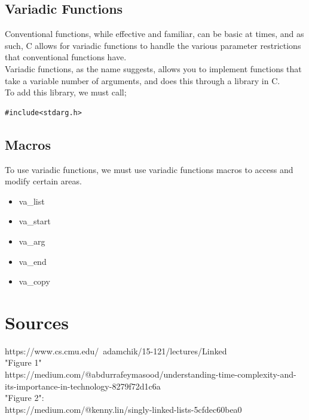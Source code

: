 \documentclass[11pt]{article}
\begin{document}
\subsection{Variadic Functions}
Conventional functions, while effective and familiar, can be basic at times, and as such, C allows for variadic functions to handle the various parameter restrictions that conventional functions have.\\[0.5\baselineskip]
Variadic functions, as the name suggests, allows you to implement functions that take a variable number of arguments, and does this through a library in C. \\[0.5\baselineskip]
To add this library, we must call;
\begin{lstlisting}[belowskip=-1.80 \baselineskip]
    #include<stdarg.h>
\end{lstlisting}
\subsection{Macros}
To use variadic functions, we must use variadic functions macros to access and modify certain areas.
\begin{itemize}
    \item va\_list
    \item va\_start
    \item va\_arg
    \item va\_end
    \item va\_copy
\end{itemize}

\section{Sources}
https://www.cs.cmu.edu/~adamchik/15-121/lectures/Linked%
\\[0.5\baselineskip]
"Figure 1"\\
https://medium.com/@abdurrafeymasood/understanding-time-complexity-and-its-importance-in-technology-8279f72d1c6a
\\[0.5\baselineskip]
"Figure 2":\\
https://medium.com/@kenny.lin/singly-linked-lists-5cfdec60bea0
\\
\end{document}
